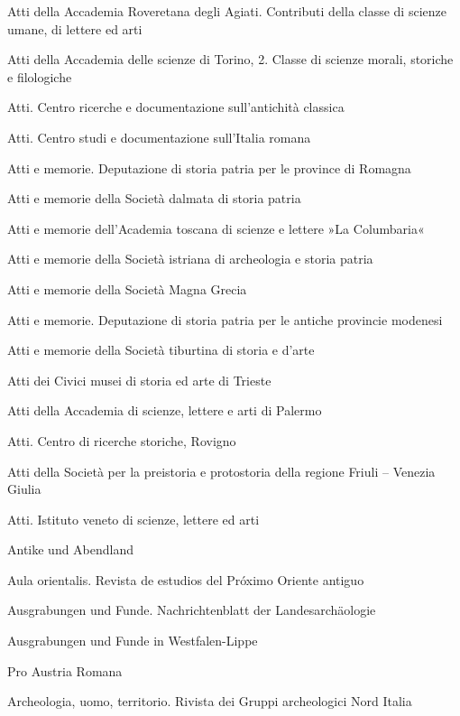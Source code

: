 \begin{footnotesize}
\begin{description}[%
				style=nextline,
				leftmargin=3cm,
				]
\item[AttiAcRov] Atti della Accademia Roveretana degli Agiati. Contributi della classe di scienze umane, di lettere ed arti 
\item[AttiAcTorino] Atti della Accademia delle scienze di Torino, 2. Classe di scienze morali, storiche e filologiche 
\item[AttiCAntCl] Atti. Centro ricerche e documentazione sull'antichità classica 
\item[AttiCItRom] Atti. Centro studi e documentazione sull'Italia romana 
\item[AttiMemBologna] Atti e memorie. Deputazione di storia patria per le province di Romagna 
\item[AttiMemDal] Atti e memorie della Società dalmata di storia patria 
\item[AttiMemFirenze] Atti e memorie dell'Academia toscana di scienze e lettere »La Columbaria« 
\item[AttiMemIstria] Atti e memorie della Società istriana di archeologia e storia patria 
\item[AttiMemMagnaGr] Atti e memorie della Società Magna Grecia 
\item[AttiMemModena] Atti e memorie. Deputazione di storia patria per le antiche provincie modenesi 
\item[AttiMemTivoli] Atti e memorie della Società tiburtina di storia e d'arte 
\item[AttiMusTrieste] Atti dei Civici musei di storia ed arte di Trieste 
\item[AttiPalermo] Atti della Accademia di scienze, lettere e arti di Palermo 
\item[AttiRovigno] Atti. Centro di ricerche storiche, Rovigno 
\item[AttiSocFriuli] Atti della Società per la preistoria e protostoria della regione Friuli -- Venezia Giulia 
\item[AttiVenezia] Atti. Istituto veneto di scienze, lettere ed arti 
\item[AuA] Antike und Abendland 
\item[AulaOr] Aula orientalis. Revista de estudios del Próximo Oriente antiguo 
\item[AusgrFu] Ausgrabungen und Funde. Nachrichtenblatt der Landesarchäologie 
\item[AusgrFuWestf] Ausgrabungen und Funde in Westfalen-Lippe 
\item[AustrRom] Pro Austria Romana 
\item[AUTerr] Archeologia, uomo, territorio. Rivista dei Gruppi archeologici Nord Italia 

\end{description}
\end{footnotesize}
